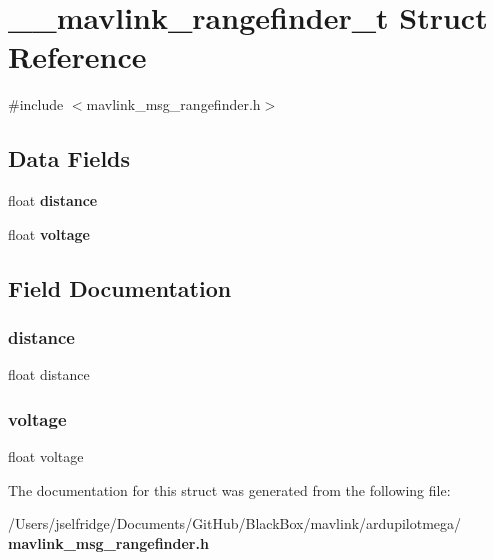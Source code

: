 \section{\+\_\+\+\_\+mavlink\+\_\+rangefinder\+\_\+t Struct Reference}
\label{struct____mavlink__rangefinder__t}


{\ttfamily \#include $<$mavlink\+\_\+msg\+\_\+rangefinder.\+h$>$}

\subsection*{Data Fields}
\begin{DoxyCompactItemize}
\item 
float \textbf{ distance}
\item 
float \textbf{ voltage}
\end{DoxyCompactItemize}


\subsection{Field Documentation}
\mbox{\label{struct____mavlink__rangefinder__t_a06f14a9abd47b91465f895d5259cdc1b}} 
\subsubsection{distance}
{\footnotesize\ttfamily float distance}

\mbox{\label{struct____mavlink__rangefinder__t_a47061fcae597f83f8a0a99d4b7b5a5c1}} 
\subsubsection{voltage}
{\footnotesize\ttfamily float voltage}



The documentation for this struct was generated from the following file\+:\begin{DoxyCompactItemize}
\item 
/\+Users/jselfridge/\+Documents/\+Git\+Hub/\+Black\+Box/mavlink/ardupilotmega/\textbf{ mavlink\+\_\+msg\+\_\+rangefinder.\+h}\end{DoxyCompactItemize}
